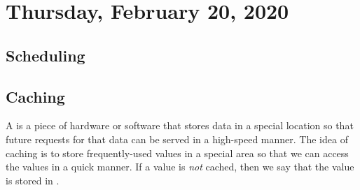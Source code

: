\section{Thursday, February 20, 2020}

\subsection{Scheduling}


\subsection{Caching}

A  is a piece of hardware or software that stores data in a special location so that future requests for that data can be served in a high-speed manner. The idea of caching is to store frequently-used values in a special area so that we can access the values in a quick manner. If a value is \textit{not} cached, then we say that the value is stored in . 